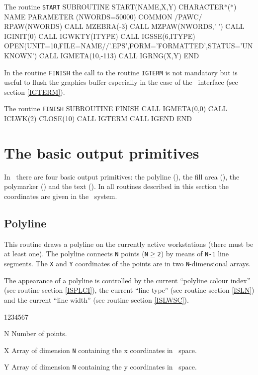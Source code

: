 \begin{XMPt}{The routine {\tt START}}
      SUBROUTINE START(NAME,X,Y)
      CHARACTER*(*) NAME
      PARAMETER (NWORDS=50000)
      COMMON /PAWC/ RPAW(NWORDS)
      CALL MZEBRA(-3)
      CALL MZPAW(NWORDS,' ')
      CALL IGINIT(0)
      CALL IGWKTY(ITYPE)
      CALL IGSSE(6,ITYPE)
      OPEN(UNIT=10,FILE=NAME//'.EPS',FORM='FORMATTED',STATUS='UNKNOWN')
      CALL IGMETA(10,-113)
      CALL IGRNG(X,Y)
      END
\end{XMPt}
In the routine {\tt FINISH} the call to the routine {\tt IGTERM} is not
mandatory but is useful to flush the graphics buffer especially in the
case of the ~interface (see section \ref{IGTERM}).
\begin{XMPt}{The routine {\tt FINISH}}
      SUBROUTINE FINISH
      CALL IGMETA(0,0)
      CALL ICLWK(2)
      CLOSE(10)
      CALL IGTERM
      CALL IGEND
      END
\end{XMPt}
\newpage
%
%
\section{The basic output primitives}
\par
In \HIGZ~there are four basic output primitives: the polyline (),
the fill area (), the polymarker () and the text
(). In all routines described in this section the coordinates
are given in the \WC~system.


\subsection{Polyline}
\Action
This routine draws a polyline on the currently active workstations (there must
be at least one). The polyline connects {\tt N} points ({\tt N$\geq$2}) by means
of {\tt N-1} line segments. The {\tt X} and {\tt Y} coordinates of the points
are in two {\tt N}-dimensional arrays.

The appearance of a polyline is controlled by the current ``polyline colour
index'' (see routine  section \ref{ISPLCI}), the current
``line type'' (see routine  section \ref{ISLN}) and the current
``line width'' (see routine  section \ref{ISLWSC}).
\Pdesc
\begin{DLtt}{1234567}
\item[N] Number of points.
\item[X] Array of dimension {\tt N} containing the x coordinates in \wc~space.
\item[Y] Array of dimension {\tt N} containing the y coordinates in \wc~space.
\end{DLtt}


